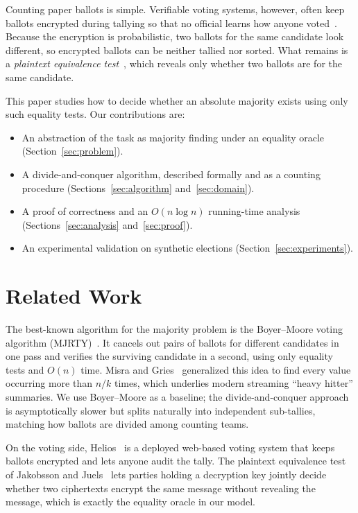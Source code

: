 \documentclass[conference]{IEEEtran}
\begin{document}
Counting paper ballots is simple. Verifiable voting systems, however, often
keep ballots encrypted during tallying so that no official learns how anyone
voted~\cite{adida2008helios}. Because the encryption is probabilistic, two
ballots for the same candidate look different, so encrypted ballots can be
neither tallied nor sorted. What remains is a \emph{plaintext equivalence
test}~\cite{jakobsson2000mix}, which reveals only whether two ballots are for
the same candidate.

This paper studies how to decide whether an absolute majority exists using only
such equality tests. Our contributions are:
\begin{itemize}
  \item An abstraction of the task as majority finding under an equality
        oracle (Section~\ref{sec:problem}).
  \item A divide-and-conquer algorithm, described formally and as a counting
        procedure (Sections~\ref{sec:algorithm} and~\ref{sec:domain}).
  \item A proof of correctness and an $O(n\log n)$ running-time analysis
        (Sections~\ref{sec:analysis} and~\ref{sec:proof}).
  \item An experimental validation on synthetic elections
        (Section~\ref{sec:experiments}).
\end{itemize}

\section{Related Work}

The best-known algorithm for the majority problem is the Boyer--Moore voting
algorithm (MJRTY)~\cite{boyer1991mjrty}. It cancels out pairs of ballots for
different candidates in one pass and verifies the surviving candidate in a
second, using only equality tests and $O(n)$ time. Misra and Gries~\cite{misra1982finding}
generalized this idea to find every value occurring more than $n/k$ times,
which underlies modern streaming ``heavy hitter'' summaries. We use
Boyer--Moore as a baseline; the divide-and-conquer approach is asymptotically
slower but splits naturally into independent sub-tallies, matching how ballots
are divided among counting teams.

On the voting side, Helios~\cite{adida2008helios} is a deployed web-based
voting system that keeps ballots encrypted and lets anyone audit the tally.
The plaintext equivalence test of Jakobsson and Juels~\cite{jakobsson2000mix}
lets parties holding a decryption key jointly decide whether two ciphertexts
encrypt the same message without revealing the message, which is exactly the
equality oracle in our model.
\end{document}
